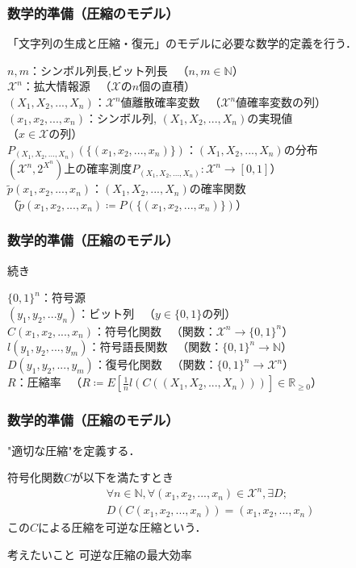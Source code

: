 \documentclass{classes/myslide}
\begin{document}
\begin{frame}\frametitle{数学的準備（圧縮のモデル）}
  「文字列の生成と圧縮・復元」のモデルに必要な数学的定義を行う．
  \begin{definition}[拡大情報源など]
    $n, m$：シンボル列長,ビット列長 \ （$n, m \in \mathbb{N}$）\\
    $\mathcal{X}^n$：拡大情報源 \ （$\mathcal{X}$の$n$個の直積）\\
    $(X_1, X_2, ..., X_n)$：$\mathcal{X}^n$値離散確率変数 \ （$\mathcal{X}^n$値確率変数の列）\\
    $(x_1, x_2, ..., x_n )$：シンボル列, $(X_1, X_2, ..., X_n)$の実現値  \\ \quad （$ x \in \mathcal{X}$の列）\\
    $P_{(X_1, X_2, ..., X_n)}(\{(x_1, x_2, ..., x_n )\})$：$(X_1, X_2, ..., X_n)$の分布 \\ \quad $(\mathcal{X}^n, 2^{{X}^n})$上の確率測度$P_{(X_1, X_2, ..., X_n)}: \mathcal{X}^n \rightarrow [0, 1]$） \\
    $\tilde{p}(x_1, x_2, ..., x_n )$：$(X_1, X_2, ..., X_n)$の確率関数 \\ \quad（$\tilde{p}(x_1, x_2, ..., x_n ) \coloneq P(\{(x_1, x_2, ..., x_n )\})$）
  \end{definition}
\end{frame}

\begin{frame}\frametitle{数学的準備（圧縮のモデル）}
  続き
  \begin{definition}[拡大情報源など]
    $\{0, 1\}^n$：符号源 \\
    $(y_1, y_2,... y_n)$：ビット列 \ （$y \in \{0, 1\}$の列）\\
    $C(x_1, x_2, ..., x_n )$：符号化関数 \ （関数：$\mathcal{X}^n \rightarrow \{0, 1\}^n$）\\
    $l(y_1, y_2, ..., y_m )$：符号語長関数 \ （関数：$\{0, 1\}^n \rightarrow \mathbb{N}$） \\
    $D(y_1, y_2, ..., y_m )$：復号化関数  \ （関数：$\{0, 1\}^n \rightarrow \mathcal{X}^n$） \\
    $R$：圧縮率 \ （$R \coloneq E[\frac{1}{n}l(C((X_1, X_2, ..., X_n)))] \in \mathbb{R}_{\geq 0}$）
  \end{definition}
\end{frame}

\begin{frame}\frametitle{数学的準備（圧縮のモデル）}
  "適切な圧縮"を定義する．
  \begin{definition}[可逆な圧縮]
    符号化関数$C$が以下を満たすとき
    \begin{multline*}
      \forall n \in \mathbb{N}, \forall (x_1, x_2, ..., x_n ) \in \mathcal{X}^n, \exists D; \\ D(C(x_1, x_2, ..., x_n )) = (x_1, x_2, ..., x_n )
    \end{multline*}
    この$C$による圧縮を可逆な圧縮という．
  \end{definition}
  \begin{alertblock}{考えたいこと}
    可逆な圧縮の最大効率
  \end{alertblock}
\end{frame}
\end{document}
